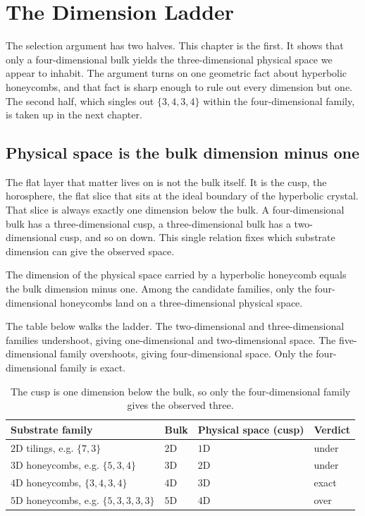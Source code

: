\section{The Dimension Ladder}

The selection argument has two halves. This chapter is the first. It shows that only a four-dimensional bulk
yields the three-dimensional physical space we appear to inhabit. The argument turns on one geometric fact about
hyperbolic honeycombs, and that fact is sharp enough to rule out every dimension but one. The second half, which
singles out $\{3,4,3,4\}$ within the four-dimensional family, is taken up in the next chapter.

\subsection{Physical space is the bulk dimension minus one}

The flat layer that matter lives on is not the bulk itself. It is the cusp, the horosphere, the flat slice that
sits at the ideal boundary of the hyperbolic crystal. That slice is always exactly one dimension below the bulk.
A four-dimensional bulk has a three-dimensional cusp, a three-dimensional bulk has a two-dimensional cusp, and so
on down. This single relation fixes which substrate dimension can give the observed space.

\begin{proposition}
The dimension of the physical space carried by a hyperbolic honeycomb equals the bulk dimension minus one. Among
the candidate families, only the four-dimensional honeycombs land on a three-dimensional physical space.
\end{proposition}

The table below walks the ladder. The two-dimensional and three-dimensional families undershoot, giving
one-dimensional and two-dimensional space. The five-dimensional family overshoots, giving four-dimensional space.
Only the four-dimensional family is exact.

\begin{table}[ht]
\centering
\begin{tabular}{llll}
\toprule
Substrate family & Bulk & Physical space (cusp) & Verdict \\
\midrule
$2$D tilings, e.g. $\{7,3\}$ & $2$D & $1$D & under \\
$3$D honeycombs, e.g. $\{5,3,4\}$ & $3$D & $2$D & under \\
$4$D honeycombs, $\{3,4,3,4\}$ & $4$D & $3$D & exact \\
$5$D honeycombs, e.g. $\{5,3,3,3,3\}$ & $5$D & $4$D & over \\
\bottomrule
\end{tabular}
\caption{The cusp is one dimension below the bulk, so only the four-dimensional family gives the observed three.}
\end{table}

